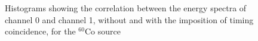  \begin{figure}[H]
	\begin{minipage}[c]{0.5\linewidth}
	\end{minipage}
	\begin{minipage}[]{0.5\linewidth}
	\centering
	\end{minipage}
	\caption{Histograms showing the correlation between the energy spectra of channel 0 and channel 1, without and with the imposition of timing coincidence, for the $^{60}$Co source}
    \label{fig:T_effect_Co}
	\end{figure}



\label{sec:timing}